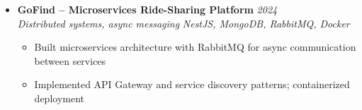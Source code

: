 \documentclass[a4paper,11pt]{article}
\begin{document}
\begin{itemize}[leftmargin=*, label={-}]
\item \textbf{GoFind -- Microservices Ride-Sharing Platform} \hfill \textit{2024} \\
\textit{Distributed systems, async messaging} \hfill \textit{NestJS, MongoDB, RabbitMQ, Docker}
\vspace{-2pt}
    \begin{itemize}[leftmargin=0.4cm, nosep, label=\tiny$\bullet$]
        \item \small{Built microservices architecture with RabbitMQ for async communication between services}
        \item \small{Implemented API Gateway and service discovery patterns; containerized deployment}
    \end{itemize}
\vspace{3pt}

\end{itemize}
\end{document}
